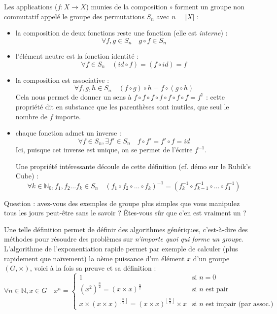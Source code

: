 \documentclass[11pt,a4paper,oneside]{book}
\begin{document}

Les applications ($f:X\rightarrow X$) munies de la composition $\circ$ forment un
groupe non commutatif appelé le groupe des permutations $S_n$ avec $n=|X|$ :
\begin{itemize}
\item la composition de deux fonctions reste une fonction
	(elle est \emph{interne}) :
	\[\forall f,g \in S_n \quad g \circ f \in S_n\]
\item l'élément neutre est la fonction identité :
	\[\forall f\in S_n \quad (id\circ f) = (f\circ id) = f\]
\item la composition est associative :
	\[\forall f, g, h \in S_n \quad (f\circ g)\circ h = f\circ (g\circ h)\]
	Cela nous permet de donner un sens à
	$f\circ f\circ f \circ f\circ f\circ f\circ f=f^7$ : cette propriété
	dit en substance que les parenthèses sont inutiles, que seul le nombre de
	$f$ importe.
\item chaque fonction admet un inverse :
	\[\forall f\in S_n, \exists f'\in S_n \quad f\circ f'=f'\circ f=id\]
	Ici, puisque cet inverse est unique, on se permet de l'écrire $f^{-1}$.

	Une propriété intéressante découle de cette définition
	(cf. démo sur le Rubik's Cube) :
	\[
		\forall k\in\mathbb{N}_0, f_1,f_2\dots f_k \in S_n \quad
		\left(f_1\circ f_2\circ \dots \circ f_k\right)^{-1} =
		\left(f_k^{-1}\circ f_{k-1}^{-1}\circ \dots \circ f_1^{-1}\right)
	\]
\end{itemize}

Question : avez-vous des exemples de groupe plus simples que vous manipulez tous
les jours peut-être sans le savoir ? Êtes-vous sûr que c'en est vraiment un ?

Une telle définition permet de définir des algorithmes génériques, c'est-à-dire
des méthodes pour résoudre des problèmes sur
\emph{n'importe quoi qui forme un groupe}.
L'algorithme de l'exponentiation rapide
permet par exemple de calculer (plus rapidement que naïvement)
la $n$ème puissance d'un élément $x$ d'un groupe $(G, \times)$,
voici à la fois sa preuve et sa définition :
\[
	\forall n \in \mathbb{N}, x \in G \quad
	x^n = \left\{\begin{array}{ll}
		1 &
			\text{si $n=0$} \\
		\left(x^2\right)^{\frac n2} = \left(x\times x\right)^{\frac n2} &
			\text{si $n$ est pair} \\
		x\times \left(x\times x\right)^{\left\lfloor\frac n2\right\rfloor} =
		\left(x\times x\right)^{\left\lfloor\frac n2\right\rfloor}\times x &
			\text{si $n$ est impair (par assoc.)}
	\end{array}\right.
\]
\end{document}
